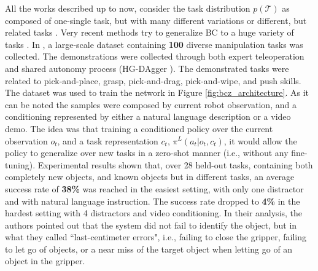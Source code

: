 All the works described up to now, consider the task distribution $p(\mathcal{T})$ as composed of one-single task, but with many different variations \cite{finn2017one_shot_visual_il} or different, but related tasks \cite{yu2018daml}. Very recent methods try to generalize BC to a huge variety of tasks \cite{jang2022bc_z,mandi2022towards_more_generalizable_one_shot}.
In \cite{jang2022bc_z}, a large-scale dataset containing \textbf{100} diverse manipulation tasks was collected. The demonstrations were collected through both expert teleoperation and shared autonomy process (HG-DAgger \cite{kelly2019hg_dagger}). The demonstrated tasks were related to pick-and-place, grasp, pick-and-drag, pick-and-wipe, and push skills. The dataset was used to train the network in Figure \ref{fig:bcz_architecture}. As it can be noted the samples were composed by current robot observation, and a conditioning represented by either a natural language description or a video demo. The idea was that training a conditioned policy over the current observation $o_{t}$, and a task representation $c_{t}$, $\pi^{L}(a_{t}|o_{t}, c_{t})$, it would allow the policy to generalize over new tasks in a zero-shot manner (i.e., without any fine-tuning). Experimental results shown that, over 28 held-out tasks, containing both completely new objects, and known objects but in different tasks, an average success rate of \textbf{38\%} was reached in the easiest setting, with only one distractor and with natural language instruction. The success rate dropped to \textbf{4\%} in the hardest setting with 4 distractors and video conditioning. %
In their analysis, the authors pointed out that the system did not fail to identify the object, but in what they called ``last-centimeter errors", i.e., failing to close the gripper, failing to let go of objects, or a near miss of the target object when letting go of an object in the gripper. 
